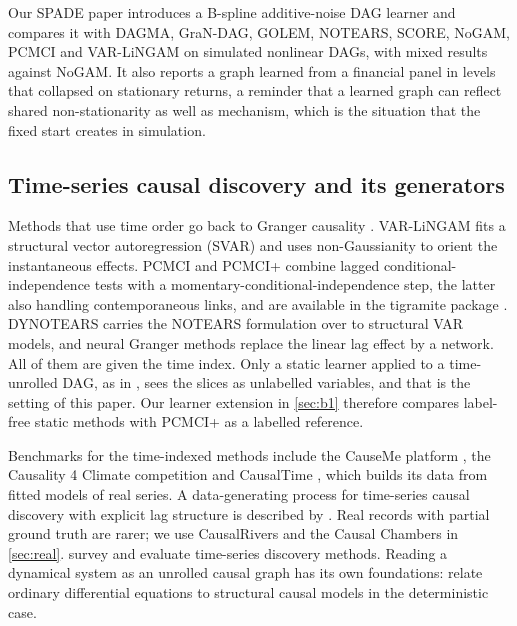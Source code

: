 \documentclass[pdflatex,sn-apa]{sn-jnl}
\theoremstyle{thmstyleone}
\theoremstyle{thmstylethree}
\theoremstyle{thmstyletwo}
\begin{document}
Our SPADE paper \citep{dang2026spade} introduces a B-spline additive-noise DAG
learner and compares it with DAGMA, GraN-DAG, GOLEM, NOTEARS, SCORE, NoGAM,
PCMCI and VAR-LiNGAM on simulated nonlinear DAGs, with mixed results against
NoGAM. It also reports a graph learned from a financial panel in levels that
collapsed on stationary returns, a reminder that a learned graph can reflect
shared non-stationarity as well as mechanism, which is the situation that the
fixed start creates in simulation.

\subsection{Time-series causal discovery and its generators}
\label{sec:rw-ts}

Methods that use time order go back to Granger causality
\citep{granger1969investigating}. VAR-LiNGAM \citep{hyvarinen2010varlingam}
fits a structural vector autoregression (SVAR) and uses non-Gaussianity to orient the
instantaneous effects. PCMCI and PCMCI+ \citep{runge2019detecting,
runge2020pcmciplus} combine lagged conditional-independence tests with a
momentary-conditional-independence step, the latter also handling contemporaneous
links, and are available in the tigramite package \citep{tigramite}.
DYNOTEARS \citep{pamfil2020dynotears} carries the NOTEARS formulation over to
structural VAR models, and neural Granger methods \citep{tank2021neural} replace
the linear lag effect by a network. All of them are given the time index. Only
a static learner applied to a time-unrolled DAG, as in
\citet{reisach2026topological}, sees the slices as unlabelled variables, and
that is the setting of this paper. Our learner extension in \cref{sec:b1}
therefore compares label-free static methods with PCMCI+ as a labelled
reference.

Benchmarks for the time-indexed methods include the CauseMe platform
\citep{runge2019inferring}, the Causality 4 Climate competition
\citep{weichwald2020causal} and CausalTime \citep{cheng2024causaltime}, which
builds its data from fitted models of real series. A data-generating process
for time-series causal discovery with explicit lag structure is described by
\citet{lawrence2021dgp}. Real records with partial ground truth are rarer; we use
CausalRivers \citep{stein2025causalrivers} and the Causal Chambers
\citep{gamella2025chambers} in \cref{sec:real}. \citet{assaad2022survey}
survey and evaluate time-series discovery methods. Reading a dynamical system
as an unrolled causal graph has its own foundations: \citet{mooij2013ode}
relate ordinary differential equations to structural causal models in the
deterministic case.
\end{document}
